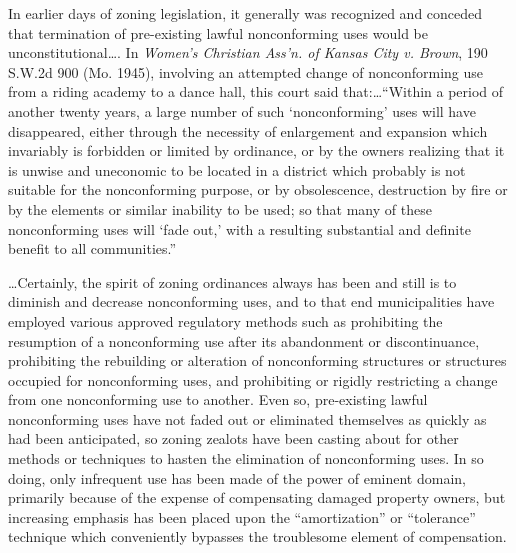 In earlier days of zoning legislation, it generally was recognized and conceded
that termination of pre-existing lawful nonconforming uses would be
unconstitutional\ldots . In \emph{Women's Christian Ass'n. of Kansas City v.
Brown}, 190 S.W.2d 900 (Mo. 1945), involving an attempted change of
nonconforming use from a riding academy to a dance hall, this court said
that:\ldots ``Within a period of another twenty years, a large number of such
`nonconforming' uses will have disappeared, either through the necessity of
enlargement and expansion which invariably is forbidden or limited by ordinance,
or by the owners realizing that it is unwise and uneconomic to be located in a
district which probably is not suitable for the nonconforming purpose, or by
obsolescence, destruction by fire or by the elements or similar inability to be
used; so that many of these nonconforming uses will `fade out,' with a resulting
substantial and definite benefit to all communities.''

\ldots Certainly, the spirit of zoning ordinances always has been and still is
to diminish and decrease nonconforming uses, and to that end municipalities have
employed various approved regulatory methods such as prohibiting the resumption
of a nonconforming use after its abandonment or discontinuance, prohibiting the
rebuilding or alteration of nonconforming structures or structures occupied for
nonconforming uses, and prohibiting or rigidly restricting a change from one
nonconforming use to another. Even so, pre-existing lawful nonconforming uses
have not faded out or eliminated themselves as quickly as had been anticipated,
so zoning zealots have been casting about for other methods or techniques to
hasten the elimination of nonconforming uses. In so doing, only infrequent use
has been made of the power of eminent domain, primarily because of the expense
of compensating damaged property owners, but increasing emphasis has been placed
upon the ``amortization'' or ``tolerance'' technique which conveniently bypasses
the troublesome element of compensation. 

